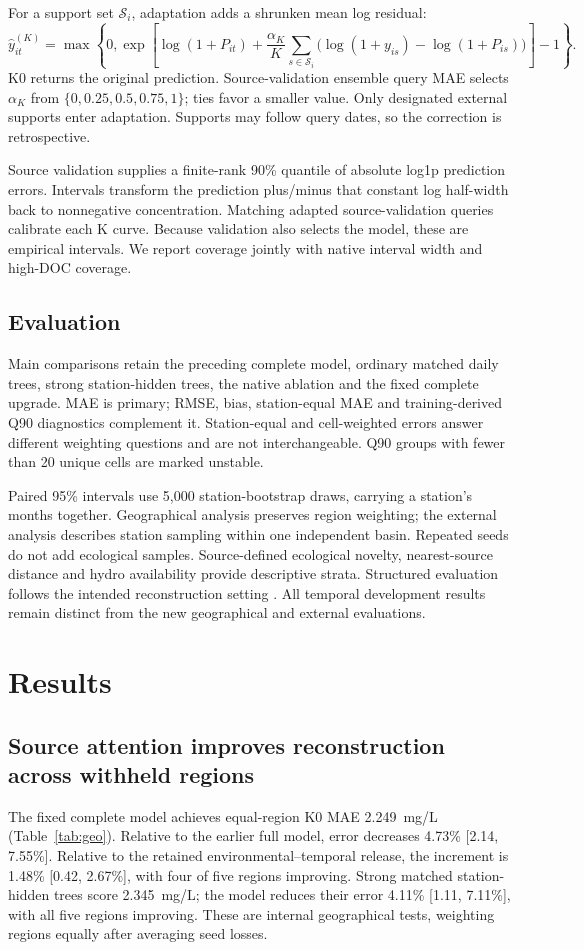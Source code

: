 \documentclass[11pt]{article}
\begin{document}
For a support set $\mathcal S_i$, adaptation adds a shrunken mean log residual:
\[
 \widehat y_{it}^{(K)}
 =\max\!\left\{0,\exp\!\left[\log(1+P_{it})
 +\frac{\alpha_K}{K}\sum_{s\in\mathcal S_i}
       \bigl(\log(1+y_{is})-\log(1+P_{is})\bigr)\right]-1\right\}.
\]
K0 returns the original prediction. Source-validation ensemble query MAE selects $\alpha_K$ from $\{0, 0.25, 0.5, 0.75, 1\}$; ties favor a smaller value. Only designated external supports enter adaptation. Supports may follow query dates, so the correction is retrospective.

Source validation supplies a finite-rank 90\% quantile of absolute log1p prediction errors. Intervals transform the prediction plus/minus that constant log half-width back to nonnegative concentration. Matching adapted source-validation queries calibrate each K curve. Because validation also selects the model, these are empirical intervals. We report coverage jointly with native interval width and high-DOC coverage.

\subsection{Evaluation}
Main comparisons retain the preceding complete model, ordinary matched daily trees, strong station-hidden trees, the native ablation and the fixed complete upgrade. MAE is primary; RMSE, bias, station-equal MAE and training-derived Q90 diagnostics complement it. Station-equal and cell-weighted errors answer different weighting questions and are not interchangeable. Q90 groups with fewer than 20 unique cells are marked unstable.

Paired 95\% intervals use 5,000 station-bootstrap draws, carrying a station's months together. Geographical analysis preserves region weighting; the external analysis describes station sampling within one independent basin. Repeated seeds do not add ecological samples. Source-defined ecological novelty, nearest-source distance and hydro availability provide descriptive strata. Structured evaluation follows the intended reconstruction setting \citep{roberts2017}. All temporal development results remain distinct from the new geographical and external evaluations.

\FloatBarrier
\section{Results}
\subsection{Source attention improves reconstruction across withheld regions}
The fixed complete model achieves equal-region K0 MAE 2.249~mg/L (Table~\ref{tab:geo}). Relative to the earlier full model, error decreases 4.73\% [2.14, 7.55\%]. Relative to the retained environmental--temporal release, the increment is 1.48\% [0.42, 2.67\%], with four of five regions improving. Strong matched station-hidden trees score 2.345~mg/L; the model reduces their error 4.11\% [1.11, 7.11\%], with all five regions improving. These are internal geographical tests, weighting regions equally after averaging seed losses.
\end{document}
